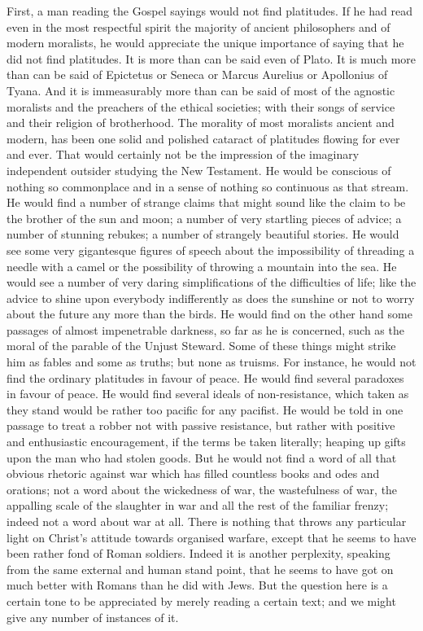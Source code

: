 First, a man reading the Gospel sayings would not find platitudes. If he had read even in the most respectful spirit the majority of ancient philosophers and of modern moralists, he would appreciate the unique importance of saying that he did not find platitudes. It is more than can be said even of Plato. It is much more than can be said of Epictetus or Seneca or Marcus Aurelius or Apollonius of Tyana. And it is immeasurably more than can be said of most of the agnostic moralists and the preachers of the ethical societies; with their songs of service and their religion of brotherhood. The morality of most moralists ancient and modern, has been one solid and polished cataract of platitudes flowing for ever and ever. That would certainly not be the impression of the imaginary independent outsider studying the New Testament. He would be conscious of nothing so commonplace and in a sense of nothing so continuous as that stream. He would find a number of strange claims that might sound like the claim to be the brother of the sun and moon; a number of very startling pieces of advice; a number of stunning rebukes; a number of strangely beautiful stories. He would see some very gigantesque figures of speech about the impossibility of threading a needle with a camel or the possibility of throwing a mountain into the sea. He would see a number of very daring simplifications of the difficulties of life; like the advice to shine upon everybody indifferently as does the sunshine or not to worry about the future any more than the birds. He would find on the other hand some passages of almost impenetrable darkness, so far as he is concerned, such as the moral of the parable of the Unjust Steward. Some of these things might strike him as fables and some as truths; but none as truisms. For instance, he would not find the ordinary platitudes in favour of peace. He would find several paradoxes in favour of peace. He would find several ideals of non-resistance, which taken as they stand would be rather too pacific for any pacifist. He would be told in one passage to treat a robber not with passive resistance, but rather with positive and enthusiastic encouragement, if the terms be taken literally; heaping up gifts upon the man who had stolen goods. But he would not find a word of all that obvious rhetoric against war which has filled countless books and odes and orations; not a word about the wickedness of war, the wastefulness of war, the appalling scale of the slaughter in war and all the rest of the familiar frenzy; indeed not a word about war at all. There is nothing that throws any particular light on Christ's attitude towards organised warfare, except that he seems to have been rather fond of Roman soldiers. Indeed it is another perplexity, speaking from the same external and human stand point, that he seems to have got on much better with Romans than he did with Jews. But the question here is a certain tone to be appreciated by merely reading a certain text; and we might give any number of instances of it.

